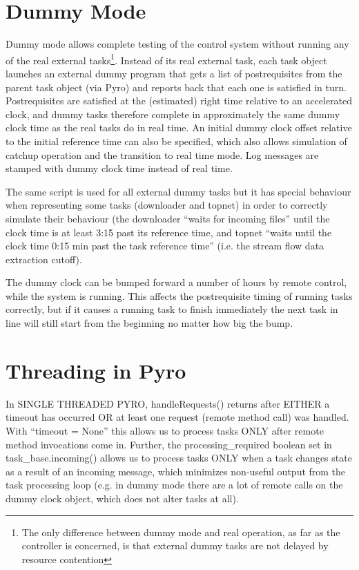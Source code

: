 \documentclass[12pt]{article}
\begin{document}
\appendix

\section{Dummy Mode}

Dummy mode allows complete testing of the control system without running
any of the real external tasks\footnote{The only difference between
dummy mode and real operation, as far as the controller is concerned, is
that external dummy tasks are not delayed by resource contention}.
Instead of its real external task, each task object launches an external
dummy program that gets a list of postrequisites from the parent task
object (via Pyro) and reports back that each one is satisfied in turn.
Postrequisites are satisfied at the (estimated) right time relative to
an accelerated clock, and dummy tasks therefore complete in
approximately the same dummy clock time as the real tasks do in real
time. An initial dummy clock offset relative to the initial reference
time can also be specified, which also allows simulation of catchup
operation and the transition to real time mode.  Log messages are
stamped with dummy clock time instead of real time.

The same script is used for all external dummy tasks but it has special
behaviour when representing some tasks (downloader and topnet) in order
to correctly simulate their behaviour (the downloader ``waits for incoming
files'' until the clock time is at least 3:15 past its reference time, and
topnet ``waits until the clock time 0:15 min past the task reference
time'' (i.e. the stream flow data extraction cutoff).

The dummy clock can be bumped forward a number of hours by remote
control, while the system is running. This affects the postrequisite
timing of running tasks correctly, but if it causes a running task to
finish immediately the next task in line will still start from the
beginning no matter how big the bump.


\section{Threading in Pyro}

In SINGLE THREADED PYRO, handleRequests() returns after EITHER a timeout has
occurred OR at least one request (remote method call) was handled.  With
``timeout = None'' this allows us to process tasks ONLY after remote method
invocations come in. Further, the processing\_required boolean set in
task\_base.incoming() allows us to process tasks ONLY when a task changes state
as a result of an incoming message, which minimizes non-useful output from the
task processing loop (e.g. in dummy mode there are a lot of remote calls on
the dummy clock object, which does not alter tasks at all). 
\end{document}
